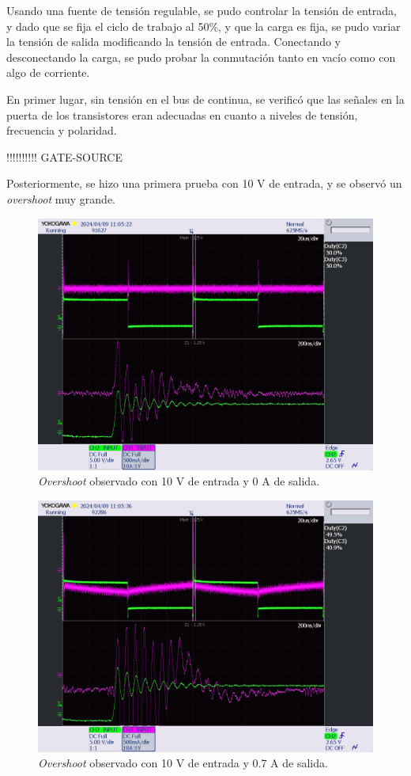 Usando una fuente de tensión regulable, se pudo controlar la tensión de entrada, y dado que se fija el ciclo de trabajo al 50\%, y que la carga es fija, se pudo variar la tensión de salida modificando la tensión de entrada. Conectando y desconectando la carga, se pudo probar la conmutación tanto en vacío como con algo de corriente.


En primer lugar, sin tensión en el bus de continua, se verificó que las señales en la puerta de los transistores eran adecuadas en cuanto a niveles de tensión, frecuencia y polaridad.

!!!!!!!!!! GATE-SOURCE


Posteriormente, se hizo una primera prueba con 10 V de entrada, y se observó un \textit{overshoot} muy grande.

\begin{figure}[H]
	\centering
	\includegraphics[width=0.7\linewidth]{fig/overshootInicial1}
	\caption{\textit{Overshoot} observado con 10 V de entrada y 0 A de salida.}
\end{figure}

\begin{figure}[H]
	\centering
	\includegraphics[width=0.7\linewidth]{fig/overshootInicial2}
	\caption{\textit{Overshoot} observado con 10 V de entrada y 0.7 A de salida.}
\end{figure}

